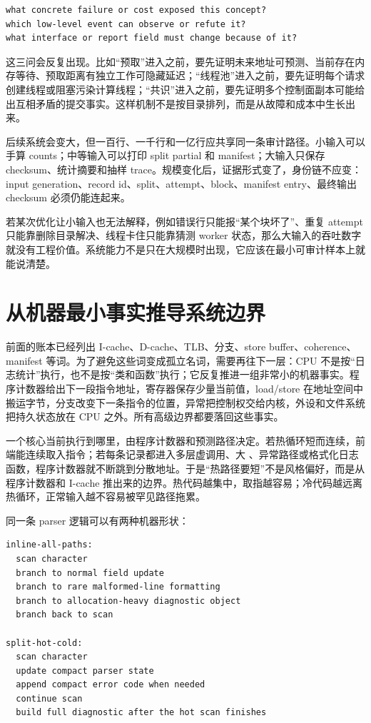 \begin{lstlisting}[numbers=none,caption={新概念进入前的三问}]
what concrete failure or cost exposed this concept?
which low-level event can observe or refute it?
what interface or report field must change because of it?
\end{lstlisting}

这三问会反复出现。比如“预取”进入之前，要先证明未来地址可预测、当前存在内存等待、预取距离有独立工作可隐藏延迟；“线程池”进入之前，要先证明每个请求创建线程或阻塞污染计算线程；“共识”进入之前，要先证明多个控制面副本可能给出互相矛盾的提交事实。这样机制不是按目录排列，而是从故障和成本中生长出来。

后续系统会变大，但一百行、一千行和一亿行应共享同一条审计路径。小输入可以手算 counts；中等输入可以打印 split partial 和 manifest；大输入只保存 checksum、统计摘要和抽样 trace。规模变化后，证据形式变了，身份链不应变：input generation、record id、split、attempt、block、manifest entry、最终输出 checksum 必须仍能连起来。

若某次优化让小输入也无法解释，例如错误行只能报“某个块坏了”、重复 attempt 只能靠删除目录解决、线程卡住只能靠猜测 worker 状态，那么大输入的吞吐数字就没有工程价值。系统能力不是只在大规模时出现，它应该在最小可审计样本上就能说清楚。

\section{从机器最小事实推导系统边界}

前面的账本已经列出 I-cache、D-cache、TLB、分支、store buffer、coherence、manifest 等词。为了避免这些词变成孤立名词，需要再往下一层：CPU 不是按“日志统计”执行，也不是按“类和函数”执行；它反复推进一组非常小的机器事实。程序计数器给出下一段指令地址，寄存器保存少量当前值，load/store 在地址空间中搬运字节，分支改变下一条指令的位置，异常把控制权交给内核，外设和文件系统把持久状态放在 CPU 之外。所有高级边界都要落回这些事实。

一个核心当前执行到哪里，由程序计数器和预测路径决定。若热循环短而连续，前端能连续取入指令；若每条记录都进入多层虚调用、大 、异常路径或格式化日志函数，程序计数器就不断跳到分散地址。于是“热路径要短”不是风格偏好，而是从程序计数器和 I-cache 推出来的边界。热代码越集中，取指越容易；冷代码越远离热循环，正常输入越不容易被罕见路径拖累。

同一条 parser 逻辑可以有两种机器形状：

\begin{lstlisting}[numbers=none,caption={两种取指形状}]
inline-all-paths:
  scan character
  branch to normal field update
  branch to rare malformed-line formatting
  branch to allocation-heavy diagnostic object
  branch back to scan

split-hot-cold:
  scan character
  update compact parser state
  append compact error code when needed
  continue scan
  build full diagnostic after the hot scan finishes
\end{lstlisting}

